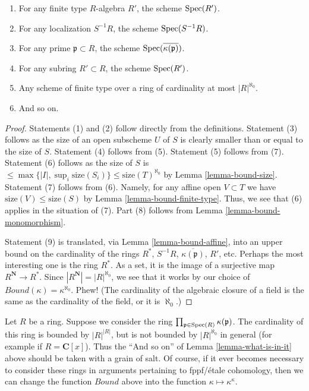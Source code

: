 \begin{lemma}
\begin{enumerate}
\begin{enumerate}
\item For any finite type $R$-algebra $R'$, the
scheme $\mathop{\rm Spec}(R')$.
\item For any localization $S^{-1}R$, the scheme $\mathop{\rm Spec}(S^{-1}R)$.
\item For any prime $\mathfrak p \subset R$, the scheme
$\mathop{\rm Spec}(\overline{\kappa(\mathfrak p)})$.
\item For any subring $R' \subset R$, the scheme
$\mathop{\rm Spec}(R')$.
\item Any scheme of finite type over a ring of cardinality at most
$|R|^{\aleph_0}$.
\item And so on.
\end{enumerate}
\end{enumerate}
\end{lemma}

\begin{proof}
Statements (1) and (2) follow directly from the definitions.
Statement (3) follows as the size of an open subscheme $U$ of $S$ is
clearly smaller than or equal to the size of $S$.
Statement (4) follows from (5).
Statement (5) follows from (7).
Statement (6) follows as the size of $S$ is
$\leq \max\{|I|, \sup_i \text{size}(S_i)\} \leq \text{size}(T)^{\aleph_0}$
by Lemma \ref{lemma-bound-size}. Statement (7) follows from (6).
Namely, for any affine open $V \subset T$ we have
$\text{size}(V) \leq \text{size}(S)$ by
Lemma \ref{lemma-bound-finite-type}.
Thus, we see that (6) applies in the situation of (7).
Part (8) follows from
Lemma \ref{lemma-bound-monomorphism}.

\medskip\noindent
Statement (9) is translated, via Lemma \ref{lemma-bound-affine},
into an upper bound on the cardinality of the rings
$R^*$, $S^{-1}R$, $\overline{\kappa(\mathfrak p)}$, $R'$, etc.
Perhaps the most interesting one is the ring $R^*$. As a
set, it is the image of a surjective map $R^{\mathbf{N}} \to R^*$.
Since $|R^{\mathbf{N}}| = |R|^{\aleph_0}$, we see that
it works by our choice of $Bound(\kappa) = \kappa^{\aleph_0}$.
Phew! (The cardinality of the algebraic closure of a field
is the same as the cardinality of the field, or it is $\aleph_0$.)
\end{proof}

\begin{remark}
\label{remark-what-is-not-in-it}
Let $R$ be a ring. Suppose we consider the ring
$\prod_{\mathfrak p \in \mathop{\rm Spec}(R)} \kappa(\mathfrak p)$.
The cardinality of this ring is bounded by $|R|^{|R|}$, but is not bounded by
$|R|^{\aleph_0}$ in general (for example if $R = \mathbf{C}[x]$).
Thus the ``And so on'' of Lemma \ref{lemma-what-is-in-it} above
should be taken with a grain of salt. Of course, if it ever becomes
necessary to consider these rings in arguments pertaining to
fppf/\'etale cohomology, then we can change the function
$Bound$ above into the function $\kappa \mapsto \kappa^\kappa$.
\end{remark}



